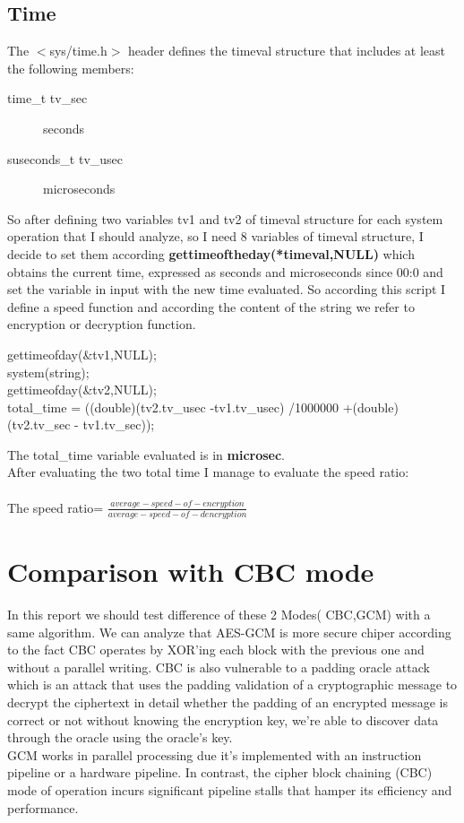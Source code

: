 \documentclass[11pt,a4paper]{article}
\begin{document}
\subsection{Time}
    The $<$sys/time.h$>$ header defines the timeval structure that includes at least the following members:
\begin{description}
    
\item[time\_t         tv\_sec]      seconds
\item[suseconds\_t    tv\_usec]     microseconds
\end{description}
So after defining two variables tv1 and tv2 of timeval structure for each system operation that I should analyze, so I need 8 variables of timeval structure, I decide to set them according \textbf{gettimeoftheday(*timeval,NULL)} which obtains the current time, expressed as seconds and microseconds since 00:0 and set the variable in input with the new time evaluated.
So according this script I define a speed function and according the content of the string we refer to encryption or decryption function. 
\begin{description}
    
\item[        gettimeofday(\&tv1,NULL);]

\item[        system(string);]
\item[        gettimeofday(\&tv2,NULL);]
    \item[        total\_time = ((double)(tv2.tv\_usec -tv1.tv\_usec) /1000000 +(double)(tv2.tv\_sec - tv1.tv\_sec));]
    
\end{description}
The total\_time variable evaluated is in \textbf{microsec}.
        \\After evaluating the two total time I manage to evaluate the speed ratio:\\\\
The speed ratio= $\frac{average-speed-of-encryption}{average-speed-of-dencryption}$\\ 
    \noindent\hrulefill 

\section{Comparison with CBC mode}
In this report we should test difference of these 2 Modes( CBC,GCM) with a  same algorithm. We can analyze that AES-GCM is more secure chiper according to the fact CBC operates by XOR'ing each block with the previous one and without a parallel writing.
CBC is also vulnerable to a padding oracle attack which is an attack that uses the padding validation of a cryptographic message to decrypt the ciphertext in detail whether the padding of an encrypted message is correct or not without knowing the encryption key, we're able to discover data through the oracle using the oracle's key.
\\GCM works in parallel processing due it's implemented with an instruction pipeline or a hardware pipeline. In contrast, the cipher block chaining (CBC) mode of operation incurs significant pipeline stalls that hamper its efficiency and performance.
 \\\\
\end{document}
